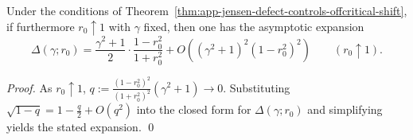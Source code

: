 \begin{corollary}\label{cor:app-jensen-offcritical-shift-boundary}
Under the conditions of Theorem~\ref{thm:app-jensen-defect-controls-offcritical-shift}, if furthermore \(r_0\uparrow 1\) with \(\gamma\) fixed, then one has the asymptotic expansion
\[
\Delta(\gamma;r_0)
=\frac{\gamma^2+1}{2}\cdot\frac{1-r_0^2}{1+r_0^2}
+O\!\left((\gamma^2+1)^2(1-r_0^2)^2\right)
\qquad(r_0\uparrow 1).
\]
\end{corollary}

\begin{proof}
As \(r_0\uparrow 1\),
\(
q:=\frac{(1-r_0^2)^2}{(1+r_0^2)^2}(\gamma^2+1)\to 0
\).
Substituting
\(
\sqrt{1-q}=1-\frac{q}{2}+O(q^2)
\)
into the closed form for \(\Delta(\gamma;r_0)\) and simplifying yields the stated expansion. \qed
\end{proof}

\endinput
